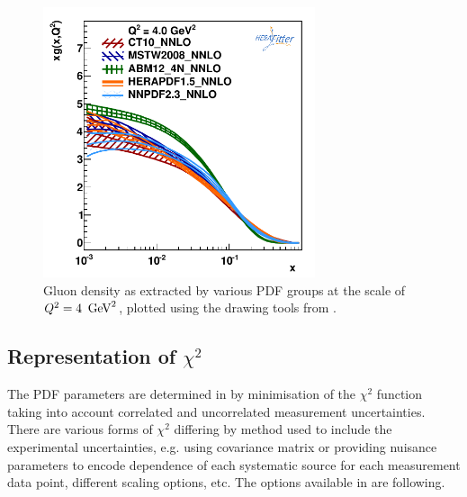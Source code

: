 \begin{figure}[!ht]
   \centering
   \includegraphics[width=8cm]{pdfs.pdf}
   \caption{Gluon density as extracted by various PDF groups at the scale of $Q^2=4 \ \,\text{Ge\hspace{-.08em}V}^2$, plotted using the drawing tools from \fitter.} 
 \label{fig:pdfs}
\end{figure}
%
\subsection{Representation of $\chi^2$}
\label{sec:chi2representation}

The PDF parameters are determined in \fitter by minimisation of the
$\chi^2$ function taking into account correlated and uncorrelated measurement uncertainties.
There are various forms of $\chi^2$ differing by method used to include 
the experimental uncertainties,
e.g. using covariance matrix or providing nuisance parameters to encode dependence of 
each systematic source for each measurement data point, different scaling options, etc. 
The options available in \fitter are following.

